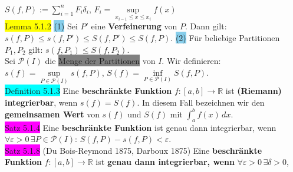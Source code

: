 \documentclass[landscape, 10pt]{article}
\newcommand{\R}{\mathbb{R}}
\begin{document}
\begin{multicols}{3}
                     \textcolor{NavyBlue}{$S(f,P):=\sum_{i=1}^nF_i\delta_i,\, 
                     F_i=\sup\limits_{x_{i-1}\leqslant x\leqslant x_i}f(x)$}\\
              \colorbox{yellow}{Lemma 5.1.2} 
                     \colorbox{SkyBlue}{(1)} Sei \textcolor{NavyBlue}{$P'$}
                     eine \textbf{Verfeinerung} von \textcolor{NavyBlue}{$P$}. Dann gilt: 
                     \textcolor{NavyBlue}{
                     $s(f,P)\leqslant s(f,P')\leqslant S(f,P')\leqslant S(f,P)$}.
                     \colorbox{SkyBlue}{(2)} Für beliebige Partitionen 
                     \textcolor{NavyBlue}{$P_1,P_2$}
                     gilt: \textcolor{NavyBlue}{$s(f,P_1)\leqslant S(f,P_2)$}.\\
              Sei \textcolor{NavyBlue}{$\mathcal{P}(I)$} 
                     die \colorbox{gray}{Menge der Partitionen} 
                     von \textcolor{NavyBlue}{$I$}. Wir definieren: 
                     \textcolor{NavyBlue}{
                     $s(f)=\sup\limits_{P\in\mathcal{P}(I)}s(f,P)$},\quad 
                     \textcolor{NavyBlue}{
                     $S(f)=\inf\limits_{P\in\mathcal{P}(I)}S(f,P)$}. \\
              \colorbox{cyan}{Definition 5.1.3} 
                     Eine \textbf{beschränkte Funktion} 
                     \textcolor{NavyBlue}{$f:[a,b]\longrightarrow\R$} 
                     ist \textbf{(Riemann) integrierbar}, wenn \textcolor{NavyBlue}{$s(f)=S(f)$}. 
                     In diesem Fall 
                     bezeichnen wir den \textbf{gemeinsamen Wert} 
                     von \textcolor{NavyBlue}{$s(f)$} und 
                     \textcolor{NavyBlue}{$S(f)$} mit 
                     \textcolor{NavyBlue}{$\int_a^bf(x)\,dx$}.\\
              \colorbox{magenta}{Satz 5.1.4} 
              Eine \textbf{beschränkte Funktion} ist 
                     genau dann integrierbar, wenn 
                     \textcolor{NavyBlue}{
                     $\forall\varepsilon>0\,\exists P\in\mathcal{P}(I)$}:
                     \textcolor{NavyBlue}{$S(f,P)-s(f,P)<\varepsilon$}.\\
              \colorbox{magenta}{Satz 5.1.8} 
              (Du Bois-Reymond 1875, Darboux 1875) 
                     Eine \textbf{beschränkte Funktion} 
                     \textcolor{NavyBlue}{$f:[a,b]\longrightarrow\R$} 
                     ist \textbf{genau dann 
                     integrierbar, wenn} 
                     \textcolor{NavyBlue}{$\forall\varepsilon>0\,\exists\delta>0$}, 

\end{multicols}
\end{document}
